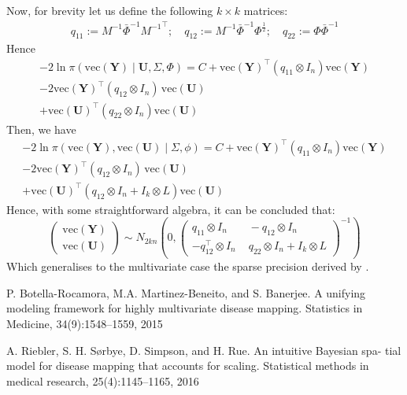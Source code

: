 \documentclass{article}
\begin{document}
Now, for brevity let us define the following $k \times k$ matrices:
\begin{align*}
q_{11} :=  M^{-1} \bar{\Phi}^{-1}{M^{-1}}^\top; \quad
q_{12} :=  M^{-1} \bar{\Phi}^{-1} \Phi^{\frac{1}{2}}; \quad
q_{22} := \Phi \bar{\Phi}^{-1}
\end{align*}
Hence 
\begin{align*}
-2 \ln \pi \left(\mathrm{vec}(\mathbf{Y}) \mid \mathbf{U}, \Sigma, \Phi \right) 
= C + \mathrm{vec}(\mathbf{Y})^{\top}
\left(q_{11} \otimes I_n \right) 
\mathrm{vec}(\mathbf{Y}) \\
%
- 2\mathrm{vec}(\mathbf{Y})^{\top} 
\left(  q_{12} \otimes I_n \right)  \,\mathrm{vec}(\mathbf{U})\\
%
+  \mathrm{vec}(\mathbf{U})^{\top}
    \left(q_{22} \otimes I_n \right)
   \mathrm{vec}(\mathbf{U})
\end{align*}
Then, we have 
\begin{align*}
-2 \ln \pi \left(\mathrm{vec}(\mathbf{Y}), \mathrm{vec}(\mathbf{U}) \mid \Sigma, \phi \right)  
= C + \mathrm{vec}(\mathbf{Y})^{\top}
\left(q_{11} \otimes I_n \right) 
\mathrm{vec}(\mathbf{Y})\\ 
%
- 2\mathrm{vec}(\mathbf{Y})^{\top} 
\left(  q_{12} \otimes I_n \right)  \,\mathrm{vec}(\mathbf{U})\\  
%
+  \mathrm{vec}(\mathbf{U})^{\top}
    \left(q_{12} \otimes I_n + I_k \otimes L\right)
   \mathrm{vec}(\mathbf{U})
\end{align*}
Hence, with some straightforward algebra, it can be concluded that:
\begin{equation} \label{eq:joint_bym_mmod}
    \begin{pmatrix}
        \mathrm{vec} (\mathbf{Y}) \\ \mathrm{vec} (\mathbf{U}) 
    \end{pmatrix}
    \sim N_{2kn} \left( 0, \begin{pmatrix}
            q_{11} \otimes I_n \, & 
            \, - q_{12} \otimes I_n \\
            - q_{12}^\top\otimes I_n \, & \,
             q_{22} \otimes I_n + I_k \otimes L
        \end{pmatrix}^{-1} \right)
\end{equation}
Which generalises to the multivariate case the sparse precision derived by \cite{BYM2}. 




\begin{thebibliography}{6}
P. Botella-Rocamora, M.A. Martinez-Beneito, and S. Banerjee. A unifying
modeling framework for highly multivariate disease mapping. Statistics in
Medicine, 34(9):1548–1559, 2015

A. Riebler, S. H. Sørbye, D. Simpson, and H. Rue. An intuitive Bayesian spa-
tial model for disease mapping that accounts for scaling. Statistical methods
in medical research, 25(4):1145–1165, 2016

\end{thebibliography}
\end{document}
